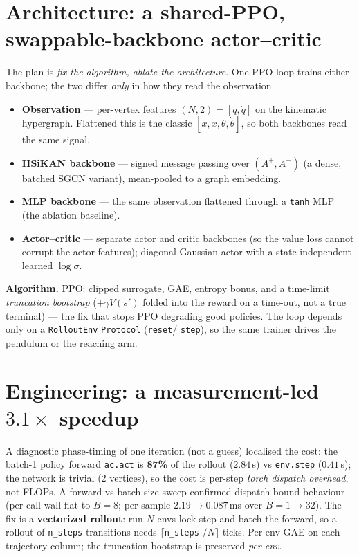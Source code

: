 \documentclass[11pt]{article}
\newcommand{\code}[1]{\texttt{\small #1}}
\begin{document}
\section{Architecture: a shared-PPO, swappable-backbone actor--critic}
The plan is \emph{fix the algorithm, ablate the architecture}. One PPO loop trains either backbone; the two
differ \emph{only} in how they read the observation.
\begin{itemize}[nosep]
  \item \textbf{Observation} --- per-vertex features $(N,2)=[q,\dot q]$ on the kinematic hypergraph.
        Flattened this is the classic $[x,\dot x,\theta,\dot\theta]$, so both backbones read the same signal.
  \item \textbf{HSiKAN backbone} --- signed message passing over $(A^+,A^-)$ (a dense, batched SGCN variant),
        mean-pooled to a graph embedding.
  \item \textbf{MLP backbone} --- the same observation flattened through a \code{tanh} MLP (the ablation
        baseline).
  \item \textbf{Actor--critic} --- separate actor and critic backbones (so the value loss cannot corrupt the
        actor features); diagonal-Gaussian actor with a state-independent learned $\log\sigma$.
\end{itemize}
\textbf{Algorithm.} PPO: clipped surrogate, GAE, entropy bonus, and a time-limit \emph{truncation bootstrap}
($+\gamma V(s')$ folded into the reward on a time-out, not a true terminal) --- the fix that stops PPO
degrading good policies. The loop depends only on a \code{RolloutEnv} \code{Protocol} (\code{reset}/
\code{step}), so the same trainer drives the pendulum or the reaching arm.

\section{Engineering: a measurement-led $3.1\times$ speedup}
A diagnostic phase-timing of one iteration (not a guess) localised the cost:
the batch-1 policy forward \code{ac.act} is \textbf{87\%} of the rollout ($2.84$\,s) vs \code{env.step}
($0.41$\,s); the network is trivial (2 vertices), so the cost is per-step \emph{torch dispatch overhead},
not FLOPs. A forward-vs-batch-size sweep confirmed dispatch-bound behaviour (per-call wall flat to $B{=}8$;
per-sample $2.19\to0.087$\,ms over $B{=}1\to32$). The fix is a \textbf{vectorized rollout}: run $N$ envs
lock-step and batch the forward, so a rollout of \code{n\_steps} transitions needs $\lceil$\code{n\_steps}
$/N\rceil$ ticks. Per-env GAE on each trajectory column; the truncation bootstrap is preserved \emph{per env}.
\end{document}
